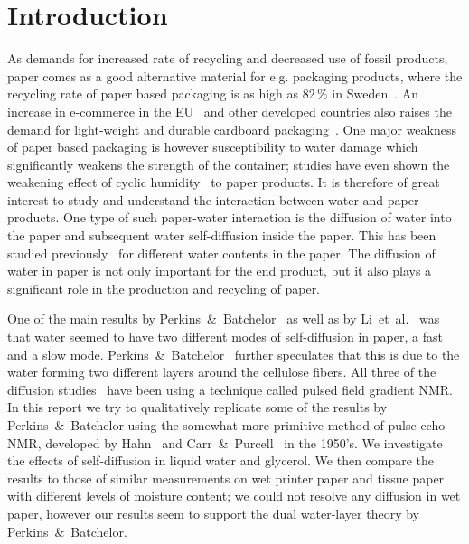 \documentclass[11pt,a4paper, twocolumn,
swedish, english %
]{article}
\begin{document}
\section{Introduction}

As demands for increased rate of recycling and decreased use of fossil
products, paper comes as a good alternative material for e.g. packaging
products, where the recycling rate of paper based packaging is as high
as 82\,\% in Sweden~\cite{Adolfson_NVV2016}. An increase in e-commerce
in the EU~\cite{eurostat_e-commerce2017} and other developed countries
also raises the demand for light-weight and durable cardboard
packaging~\cite{Nordstrand2003}. One major weakness of paper based 
packaging is however susceptibility to water damage which
significantly weakens the strength of the container; studies have even
shown the weakening effect of cyclic
humidity~\cite{Sorensen-Hoffmann2004} to paper products. It is 
therefore of great interest to study and understand the interaction
between water and paper products. 
One type of such paper-water interaction is the diffusion of water
into the paper and subsequent water self-diffusion inside the 
paper. This has been studied previously~\cite{Perkins-Batchelor2012,
  Li-etal1992, Topgaard-Soderman2001} for different water contents in
the paper. The diffusion of water in paper is not only important for
the end product, but it also plays a significant role in the
production and recycling of paper.

One of the main results by
Perkins~\&~Batchelor~\cite{Perkins-Batchelor2012} as well as by
Li~et~al.~\cite{Li-etal1992} was that water 
seemed to have two different modes of self-diffusion in paper, a fast
and a slow mode. Perkins~\&~Batchelor~\cite{Perkins-Batchelor2012}
further speculates that this is due to the water forming two different
layers around the cellulose fibers. All three of the diffusion
studies~\cite{Perkins-Batchelor2012, Li-etal1992,
  Topgaard-Soderman2001} have been using a technique called pulsed 
field gradient NMR. In this report we try to qualitatively replicate
some of the results by Perkins~\&~Batchelor using the
somewhat more primitive method of pulse echo NMR, developed by
Hahn~\cite{Hahn1950} and Carr~\&~Purcell~\cite{Carr-Purcell1954} in
the 1950's. We investigate the effects of self-diffusion in liquid
water and glycerol. We then compare the results to those of similar
measurements on wet printer paper and tissue paper with different
levels of moisture content; we could not resolve any diffusion in wet
paper, however our results seem to support the dual water-layer theory
by Perkins~\&~Batchelor.
\end{document}
